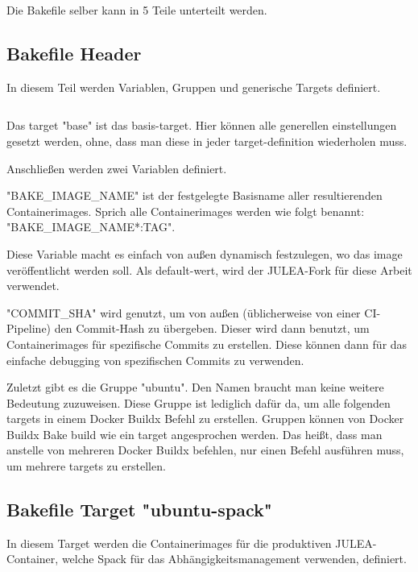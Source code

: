 Die Bakefile selber kann in 5 Teile unterteilt werden.

\subsection{Bakefile Header}

In diesem Teil werden Variablen, Gruppen und generische Targets definiert.
\inputminted[firstline=1,lastline=7]{./lexers/docker-bake-lexer.py}{./code-examples/docker-bake.hcl}

Das target "base" ist das basis-target. Hier können alle generellen einstellungen gesetzt werden, ohne, dass man diese in jeder target-definition wiederholen muss. 

Anschließen werden zwei Variablen definiert. 

"BAKE\_IMAGE\_NAME" ist der festgelegte Basisname aller resultierenden Containerimages. Sprich alle Containerimages werden wie folgt benannt: "BAKE\_IMAGE\_NAME*:TAG".

Diese Variable macht es einfach von außen dynamisch festzulegen, wo das image veröffentlicht werden soll. Als default-wert, wird der JULEA-Fork für diese Arbeit verwendet.

"COMMIT\_SHA" wird genutzt, um von außen (üblicherweise von einer CI-Pipeline) den Commit-Hash zu übergeben. Dieser wird dann benutzt, um Containerimages für spezifische Commits zu erstellen. Diese können dann für das einfache debugging von spezifischen Commits zu verwenden.

Zuletzt gibt es die Gruppe "ubuntu". Den Namen braucht man keine weitere Bedeutung zuzuweisen. Diese Gruppe ist lediglich dafür da, um alle folgenden targets in einem Docker Buildx Befehl zu erstellen. Gruppen können von Docker Buildx Bake build wie ein target angesprochen werden. Das heißt, dass man anstelle von mehreren Docker Buildx befehlen, nur einen Befehl ausführen muss, um mehrere targets zu erstellen.

\subsection{Bakefile Target "ubuntu-spack"}

In diesem Target werden die Containerimages für die produktiven JULEA-Container, welche Spack für das Abhängigkeitsmanagement verwenden, definiert.

\inputminted[firstline=9,lastline=33]{./lexers/docker-bake-lexer.py}{./code-examples/docker-bake.hcl}

